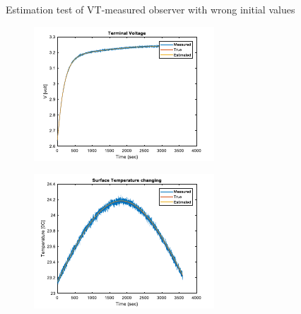 \documentclass[12pt]{article}
\begin{document}
\begin{figure}[H]
\begin{subfigure}[t]{0.3\linewidth}
	\end{subfigure}	
	\caption{Estimation test of VT-measured observer with wrong initial values }\label{fig:estVTini}
\end{figure}
\begin{figure}[H]
	\centering
	\begin{subfigure}[t]{0.3\linewidth}
		\includegraphics[width=\linewidth]{figures/estVTpar1.pdf}
	\end{subfigure}
	\begin{subfigure}[t]{0.3\linewidth}
		\includegraphics[width=\linewidth]{figures/estVTpar2.pdf}
	\end{subfigure}	
	\begin{subfigure}[t]{0.3\linewidth}

\end{subfigure}
\end{figure}
\end{document}
